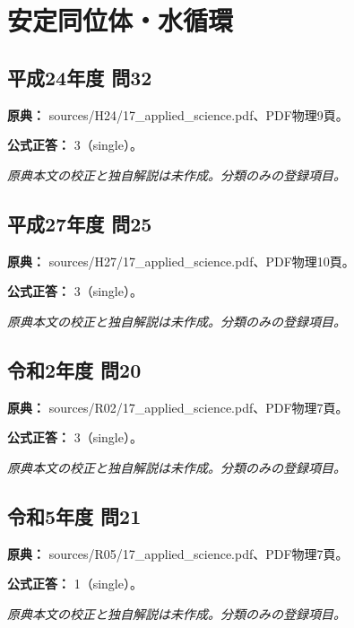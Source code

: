 \section{安定同位体・水循環}

\subsection{平成24年度 問32}
\label{q:h24-reg-applied-32}

\noindent\textbf{原典：} sources/H24/17\_applied\_science.pdf、PDF物理9頁。

\textbf{公式正答：} 3（single）。

\par\textit{原典本文の校正と独自解説は未作成。分類のみの登録項目。}

\subsection{平成27年度 問25}
\label{q:h27-reg-applied-25}

\noindent\textbf{原典：} sources/H27/17\_applied\_science.pdf、PDF物理10頁。

\textbf{公式正答：} 3（single）。

\par\textit{原典本文の校正と独自解説は未作成。分類のみの登録項目。}

\subsection{令和2年度 問20}
\label{q:r02-reg-applied-20}

\noindent\textbf{原典：} sources/R02/17\_applied\_science.pdf、PDF物理7頁。

\textbf{公式正答：} 3（single）。

\par\textit{原典本文の校正と独自解説は未作成。分類のみの登録項目。}

\subsection{令和5年度 問21}
\label{q:r05-reg-applied-21}

\noindent\textbf{原典：} sources/R05/17\_applied\_science.pdf、PDF物理7頁。

\textbf{公式正答：} 1（single）。

\par\textit{原典本文の校正と独自解説は未作成。分類のみの登録項目。}

